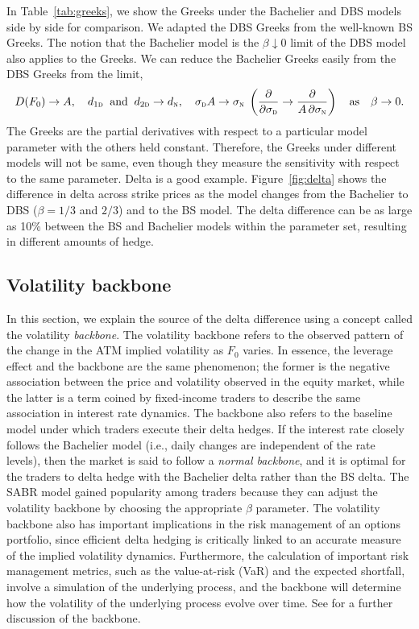 \documentclass[a4paper,review]{elsarticle}
\newcommand{\qtext}[2][\quad]{#1\text{#2}#1}
\newcommand{\sigman}{\sigma_\textsc{n}}
\newcommand{\sigmad}{\sigma_\textsc{d}}
\newcommand{\norm}{\textsc{n}}
\newcommand{\disp}{\textsc{d}}
\begin{document}
In Table~\ref{tab:greeks}, we show the Greeks under the Bachelier and DBS models side by side for comparison. We adapted the DBS Greeks from the well-known BS Greeks. The notion that the Bachelier model is the $\beta\downarrow 0$ limit of the DBS model also applies to the Greeks. We can reduce the Bachelier Greeks easily from the DBS Greeks from the limit,
$$ D(F_0) \rightarrow A,\quad d_{1\disp}\;\; \text{and}\;\; d_{2\disp} \rightarrow d_\norm, \quad \sigmad A \rightarrow \sigman\; \left(\frac{\partial}{\partial \sigmad}\rightarrow\frac{\partial}{A\,\partial \sigman}\right) \qtext{as}\beta\rightarrow 0.
$$
The Greeks are the partial derivatives with respect to a particular model parameter with the others held constant. Therefore, the Greeks under different models will not be same, even though they measure the sensitivity with respect to the same parameter. Delta is a good example. Figure~\ref{fig:delta} shows the difference in delta across strike prices as the model changes from the Bachelier to DBS ($\beta=1/3$ and $2/3$) and to the BS model. The delta difference can be as large as 10\% between the BS and Bachelier models within the parameter set, resulting in different amounts of hedge.

\subsection{Volatility backbone} \label{ssec:backbone} \noindent
In this section, we explain the source of the delta difference using a concept called the volatility \textit{backbone}. The volatility backbone refers to the observed pattern of the change in the ATM implied volatility as $F_0$ varies. In essence, the leverage effect and the backbone are the same phenomenon; the former is the negative association between the price and volatility observed in the equity market, while the latter is a term coined by fixed-income traders to describe the same association in interest rate dynamics. The backbone also refers to the baseline model under which traders execute their delta hedges. If the interest rate closely follows the Bachelier model (i.e., daily changes are independent of the rate levels), then the market is said to follow a \textit{normal backbone}, and it is optimal for the traders to delta hedge with the Bachelier delta rather than the BS delta. The SABR model gained popularity among traders because they can adjust the volatility backbone by choosing the appropriate $\beta$ parameter. The volatility backbone also has important implications in the risk management of an options portfolio, since efficient delta hedging is critically linked to an accurate measure of the implied volatility dynamics. Furthermore, the calculation of important risk management metrics, such as the value-at-risk (VaR) and the expected shortfall, involve a simulation of the underlying process, and the backbone will determine how the volatility of the underlying process evolve over time. See \citet{neo2019swaption} for a further discussion of the backbone.
\end{document}
